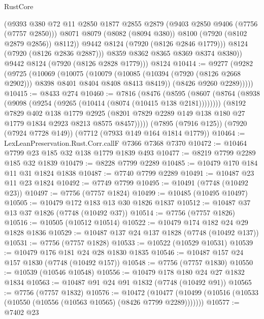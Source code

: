 \begin{lexlean}{RustCore}
\begin{coremodule}
                (@9393
                  @380
                  @72
                  @11
                  @2850
                  @1877
                  @2855
                  @2879
                  (@9403 @2850 @9406 (@7756 (@7757 @2850)))
                  @8071
                  @8079
                  (@8082 (@8094 @380))
                  @8100
                  (@7920 (@8102 @2879 @2856))
                  @8112))
              @9442
              @8124
              (@7920 (@8126 @2846 @1779)))
            @8124
            (@7920 (@8126 @2836 @2887)))
          @8359
          @8362
          @8365
          @8369
          @8374
          @8380))
      @9442
      @8124
      (@7920 (@8126 @2828 @1779)))
    @8124
@10414 := @9277
    (@9282
      (@9725
        (@10069
          (@10075
            (@10079
              (@10085 (@10394 (@7920 (@8126 @2668 @2902))) @8398 @8401 @8404 @8408 @8413 @8419))
            (@8426 @9260 @2289)))))
@10415 := @8433 @274
@10460 := @7816
    (@8476
      (@8595
        (@8607
          (@8764 (@8938 (@9098 (@9254 (@9265 (@10414 (@8074 (@10415 @138 @2181))))))))
          (@8192
            @7829
            @402
            @138
            @1779
            @2925
            (@8201 @7829 @2289 @149 @138 @180 @27 @1779 @1834 @2923 @8213 @8575 @8457)))))
    (@7895 (@7916 @125))
    (@7920 (@7924 @7728 @149))
    (@7712 (@7933 @149 @164 @1814 @1779))
@10464 := LexLeanPreservation.Rust.Corr.callF @7366 @7368 @7370
@10472 := @10464 @7799 @23 @185 @32 @138 @1779 @1839 @493
@10477 := @8219 @7799 @2289 @185 @32 @1839
@10479 := @8228 @7799 @2289
@10485 := @10479 @170 @184 @11 @31 @1824 @1838
@10487 := @7740 @7799 @2289
@10491 := @10487 @23 @11 @23 @1824
@10492 := @7749 @7799
@10495 := @10491 (@7748 (@10492 @23))
@10497 := @7756 (@7757 @1824)
@10499 := @10485 (@10495 @10497)
@10505 := @10479 @172 @183 @13 @30 @1826 @1837
@10512 := @10487 @37 @13 @37 @1826 (@7748 (@10492 @37))
@10514 := @7756 (@7757 @1826)
@10516 := @10505 (@10512 @10514)
@10522 := @10479 @174 @182 @24 @29 @1828 @1836
@10529 := @10487 @137 @24 @137 @1828 (@7748 (@10492 @137))
@10531 := @7756 (@7757 @1828)
@10533 := @10522 (@10529 @10531)
@10539 := @10479 @176 @181 @24 @28 @1830 @1835
@10546 := @10487 @157 @24 @157 @1830 (@7748 (@10492 @157))
@10548 := @7756 (@7757 @1830)
@10550 := @10539 (@10546 @10548)
@10556 := @10479 @178 @180 @24 @27 @1832 @1834
@10563 := @10487 @91 @24 @91 @1832 (@7748 (@10492 @91))
@10565 := @7756 (@7757 @1832)
@10576 := @10472
    (@10477 (@10499 (@10516 (@10533 (@10550 (@10556 (@10563 @10565) (@8426 @7799 @2289)))))))
@10577 := @7402 @23

\end{coremodule}
\end{lexlean}
